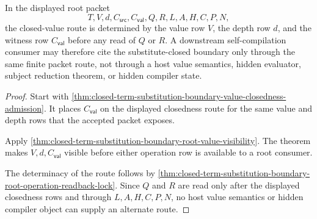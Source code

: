 \begin{theorem}
\label{thm:closed-term-substitution-boundary-closed-value-route-determinacy}
In the displayed root packet
$$
T,V,d,C_{\mathsf{src}},C_{\mathsf{val}},Q,R,L,A,H,C,P,N,
$$
the closed-value route is determined by the value row $V$, the depth row $d$, and the witness row $C_{\mathsf{val}}$ before any read of $Q$ or $R$. A downstream self-compilation consumer may therefore cite the substitute-closed boundary only through the same finite packet route, not through a host value semantics, hidden evaluator, subject reduction theorem, or hidden compiler state.
\end{theorem}
\begin{proof}
Start with \autoref{thm:closed-term-substitution-boundary-value-closedness-admission}. It places $C_{\mathsf{val}}$ on the displayed closedness route for the same value and depth rows that the accepted packet exposes.

Apply \autoref{thm:closed-term-substitution-boundary-root-value-visibility}. The theorem makes $V,d,C_{\mathsf{val}}$ visible before either operation row is available to a root consumer.

The determinacy of the route follows by \autoref{thm:closed-term-substitution-boundary-root-operation-readback-lock}. Since $Q$ and $R$ are read only after the displayed closedness rows and through $L,A,H,C,P,N$, no host value semantics or hidden compiler object can supply an alternate route.
\end{proof}

